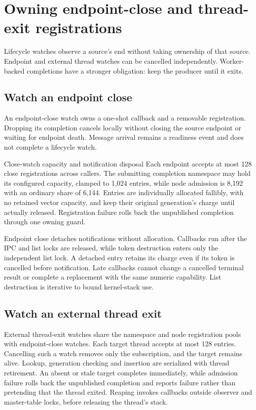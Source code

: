 \section{Owning endpoint-close and thread-exit registrations}

Lifecycle watches observe a source's end without taking ownership of that source.
Endpoint and external thread watches can be cancelled independently. Worker-backed
completions have a stronger obligation: keep the producer until it exits.

\subsection{Watch an endpoint close}

An endpoint-close watch owns a one-shot callback and a removable registration.
Dropping its completion cancels locally without closing the source endpoint or
waiting for endpoint death. Message arrival remains a readiness event and does
not complete a lifecycle watch.

\begin{implementationdetail}{Close-watch capacity and notification disposal}
Each endpoint accepts at most 128 close registrations across callers. The
submitting completion namespace may hold its configured capacity, clamped to
1,024 entries, while node admission is 8,192 with an ordinary share of 6,144. Entries
are individually allocated fallibly, with no retained vector capacity, and
keep their original generation's charge until actually released. Registration
failure rolls back the unpublished completion through one owning guard.

Endpoint close detaches notifications without allocation. Callbacks run after
the IPC and list locks are released, while token destruction enters only the
independent list lock. A detached entry retains its charge even if its token
is cancelled before notification. Late callbacks cannot change a cancelled
terminal result or complete a replacement with the same numeric capability.
List destruction is iterative to bound kernel-stack use.
\end{implementationdetail}

\subsection{Watch an external thread exit}

External thread-exit watches share the namespace and node registration pools
with endpoint-close watches. Each target thread accepts at most 128 entries.
Cancelling such a watch removes only the subscription, and the target remains
alive. Lookup, generation checking and insertion are serialized with thread
retirement. An absent or stale target completes immediately, while admission
failure rolls back the unpublished completion and reports failure rather than
pretending that the thread exited. Reaping invokes callbacks outside observer
and master-table locks, before releasing the thread's stack.

